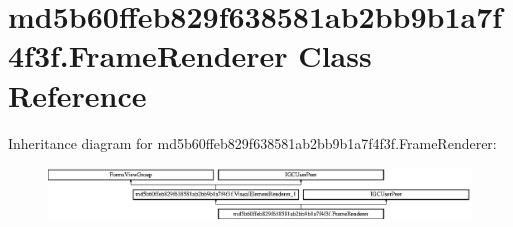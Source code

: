 \hypertarget{classmd5b60ffeb829f638581ab2bb9b1a7f4f3f_1_1FrameRenderer}{}\section{md5b60ffeb829f638581ab2bb9b1a7f4f3f.\+Frame\+Renderer Class Reference}
\label{classmd5b60ffeb829f638581ab2bb9b1a7f4f3f_1_1FrameRenderer}
Inheritance diagram for md5b60ffeb829f638581ab2bb9b1a7f4f3f.\+Frame\+Renderer\+:\begin{figure}[H]
\begin{center}
\leavevmode
\includegraphics[height=1.403509cm]{classmd5b60ffeb829f638581ab2bb9b1a7f4f3f_1_1FrameRenderer}
\end{center}
\end{figure}
